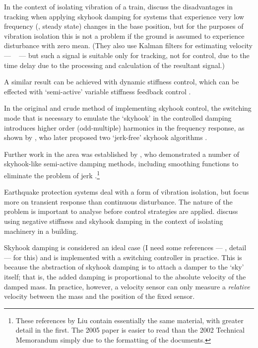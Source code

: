 In the context of isolating vibration of a train, \textcite{li1999} discuss the disadvantages in tracking when applying skyhook damping for systems that experience very low frequency (\ie, steady state) changes in the base position, but for the purposes of vibration isolation this is not a problem if the ground is assumed to experience disturbance with zero mean.
(They also use Kalman filters for estimating velocity — \cf\  — but such a signal is suitable only for tracking, not for control, due to the time delay due to the processing and calculation of the resultant signal.)

A similar result  can be achieved with dynamic stiffness control, which can be effected with `semi-active' variable stiffness feedback control \cite{leavitt2007}.

In the original and crude method of implementing skyhook control, the
switching mode that is necessary to emulate the `skyhook' in the controlled
damping introduces higher order (odd-multiple) harmonics in the frequency
response, as shown by \textcite{ahmadian2001}, who later proposed two
`jerk-free' skyhook algorithms \cite{ahmadian2004}.

Further work in the area was established by \textcite{liu2002}, who
demonstrated a number of skyhook-like semi-active damping methods, including
smoothing functions to eliminate the problem of jerk
\cite{liu2005}.\footnote{These references by Liu contain essentially the same
material, with greater detail in the first.
The 2005 paper is easier to read
than the 2002 Technical Memorandum simply due to the formatting of the
documents.}

Earthquake protection systems deal with a form of vibration isolation,
but focus more on transient response than continuous disturbance.
The
nature of the problem is important to analyse before control
strategies are applied.
\textcite{gavin2007} discuss using negative
stiffness and skyhook damping in the context of isolating machinery
in a building.

Skyhook damping is considered an ideal case (I need some references
— \ie, detail — for this) and is implemented with a switching
controller in practice.
This is because the abstraction of skyhook
damping is to attach a damper to the `sky' itself; that is, the added
damping is proportional to the absolute velocity of the damped
mass.
In practice, however, a velocity sensor can only measure a
\emph{relative} velocity between the mass and the position of the
fixed sensor.

